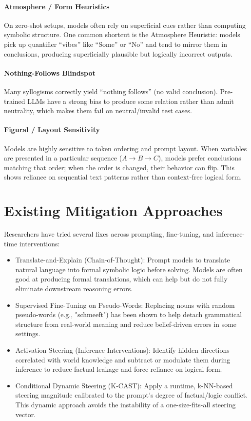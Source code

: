 \documentclass[11pt]{article}
\begin{document}
\paragraph{Atmosphere / Form Heuristics}
On zero-shot setups, models often rely on superficial cues rather than computing symbolic structure. One common shortcut is the Atmosphere Heuristic: models pick up quantifier ``vibes'' like ``Some'' or ``No'' and tend to mirror them in conclusions, producing superficially plausible but logically incorrect outputs.

\paragraph{Nothing-Follows Blindspot}
Many syllogisms correctly yield ``nothing follows'' (no valid conclusion). Pre-trained LLMs have a strong bias to produce some relation rather than admit neutrality, which makes them fail on neutral/invalid test cases.

\paragraph{Figural / Layout Sensitivity}
Models are highly sensitive to token ordering and prompt layout. When variables are presented in a particular sequence ($A \rightarrow B \rightarrow C$), models prefer conclusions matching that order; when the order is changed, their behavior can flip. This shows reliance on sequential text patterns rather than context-free logical form.

\section{Existing Mitigation Approaches}

Researchers have tried several fixes across prompting, fine-tuning, and inference-time interventions:

\begin{itemize}
	\item Translate-and-Explain (Chain-of-Thought): Prompt models to translate natural language into formal symbolic logic before solving. Models are often good at producing formal translations, which can help but do not fully eliminate downstream reasoning errors.
	\item Supervised Fine-Tuning on Pseudo-Words: Replacing nouns with random pseudo-words (e.g., "schmeeft") has been shown to help detach grammatical structure from real-world meaning and reduce belief-driven errors in some settings.
	\item Activation Steering (Inference Interventions): Identify hidden directions correlated with world knowledge and subtract or modulate them during inference to reduce factual leakage and force reliance on logical form.
	\item Conditional Dynamic Steering (K-CAST): Apply a runtime, k-NN-based steering magnitude calibrated to the prompt's degree of factual/logic conflict. This dynamic approach avoids the instability of a one-size-fits-all steering vector.
\end{itemize}
\end{document}
